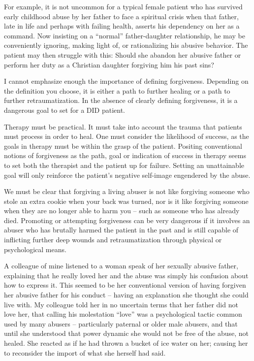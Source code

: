 \documentclass[]{book}
\begin{document}
For example, it is not uncommon for a typical female patient who has survived early childhood abuse by her father to face a spiritual crisis when that father, late in life and perhaps with failing health, asserts his dependency on her as a command. Now insisting on a ``normal'' father-daughter relationship, he may be conveniently ignoring, making light of, or rationalizing his abusive behavior. The patient may then struggle with this: Should she abandon her abusive father or perform her duty as a Christian daughter forgiving him his past sins?

I cannot emphasize enough the importance of defining forgiveness. Depending on the definition you choose, it is either a path to further healing or a path to further retraumatization. In the absence of clearly defining forgiveness, it is a dangerous goal to set for a DID patient.

Therapy must be practical. It must take into account the trauma that patients must process in order to heal. One must consider the likelihood of success, as the goals in therapy must be within the grasp of the patient. Positing conventional notions of forgiveness as the path, goal or indication of success in therapy seems to set both the therapist and the patient up for failure. Setting an unattainable goal will only reinforce the patient's negative self-image engendered by the abuse.

We must be clear that forgiving a living abuser is not like forgiving someone who stole an extra cookie when your back was turned, nor is it like forgiving someone when they are no longer able to harm you -- such as someone who has already died. Promoting or attempting forgiveness can be very dangerous if it involves an abuser who has brutally harmed the patient in the past and is still capable of inflicting further deep wounds and retraumatization through physical or psychological means.

A colleague of mine listened to a woman speak of her sexually abusive father, explaining that he really loved her and the abuse was simply his confusion about how to express it. This seemed to be her conventional version of having forgiven her abusive father for his conduct -- having an explanation she thought she could live with. My colleague told her in no uncertain terms that her father did not love her, that calling his molestation ``love'' was a psychological tactic common used by many abusers -- particularly paternal or older male abusers, and that until she understood that power dynamic she would not be free of the abuse, not healed. She reacted as if he had thrown a bucket of ice water on her; causing her to reconsider the import of what she herself had said.
\end{document}
